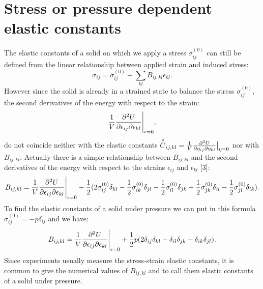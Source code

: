 \documentclass[12pt,a4paper,twoside]{report}
\begin{document}
\newpage
{\color{dark-blue}\chapter{Stress or pressure dependent elastic constants}}
\color{black}

The elastic constants of a solid on which we apply a stress 
$\sigma^{(0)}_{ij}$ can still
be defined from the linear relationship between applied strain and 
induced stress: 
\begin{equation}
\sigma_{ij} =\sigma^{(0)}_{ij}+\sum_{kl} B_{ij,kl} \epsilon_{kl}.
\end{equation}
However since the solid is already in a strained state
to balance the stress $\sigma^{(0)}_{ij}$, the second derivatives of
the energy with respect to the strain:
\begin{equation}
{1 \over V}{\partial^2 U \over \partial \epsilon_{ij} \partial \epsilon_{kl}}
\Bigg|_{\epsilon=0},
\end{equation}
do not coincide neither with the elastic constants
$\overset{\circ}{C}_{ij,kl}={1 \over V}{\partial^2 U \over \partial \eta_{ij} \partial 
\eta_{kl}}\big|_{\eta=0}$ nor with $B_{ij,kl}$. Actually there is a simple 
relationship between $B_{ij,kl}$ and the 
second derivatives of the energy with respect to the strains
$\epsilon_{ij}$ and $\epsilon_{kl}$ [3]:
\begin{equation}
B_{ij,kl} = {1 \over V}{\partial^2 U \over \partial \epsilon_{ij} 
\partial \epsilon_{kl}}\Bigg|_{\epsilon=0} - 
{1\over 2} (2 \sigma^{(0)}_{ij} \delta_{kl} 
-{1\over 2} \sigma^{(0)}_{ik} \delta_{jl} 
-{1\over 2} \sigma^{(0)}_{il} \delta_{jk} 
-{1\over 2} \sigma^{(0)}_{jk} \delta_{il} 
-{1\over 2} \sigma^{(0)}_{jl} \delta_{ik} ).
\label{eqsd2}
\end{equation}
To find the elastic constants of a solid under pressure we can
put in this formula $\sigma^{(0)}_{ij}=-p \delta_{ij}$ and we
have:
\begin{equation}
B_{ij,kl} = {1 \over V}{\partial^2 U \over \partial \epsilon_{ij} 
\partial \epsilon_{kl}}\Bigg|_{\epsilon=0} + 
{1\over 2} p (2 \delta_{ij} \delta_{kl} - 
 \delta_{il} \delta_{jk} - \delta_{ik} \delta_{jl} ).
\end{equation}
Since experiments usually measure the stress-strain elastic constants,
it is common to give the numerical values of $B_{ij,kl}$ and to call them 
elastic constants of a solid under pressure. 
\end{document}
